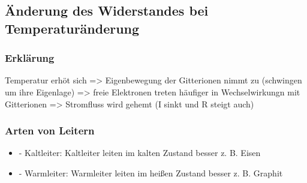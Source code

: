 \documentclass[../../main.tex]{subfiles}
\begin{document}
\subsection{Änderung des Widerstandes bei Temperaturänderung}
\subsubsection{Erklärung}
Temperatur erhöt sich \newline
=> Eigenbewegung der Gitterionen nimmt zu (schwingen um ihre Eigenlage) \newline
=> freie Elektronen treten häufiger in Wechselwirkungn mit Gitterionen \newline
=> Stromfluss wird gehemt (I sinkt und R steigt auch) \newline
\subsubsection{Arten von Leitern}
\begin{itemize}
    \item - Kaltleiter: \newline
    Kaltleiter leiten im kalten Zustand besser \newline
z. B. Eisen
\item - Warmleiter: \newline
Warmleiter leiten im heißen Zustand besser \newline
z. B. Graphit
\end{itemize}
\end{document}
